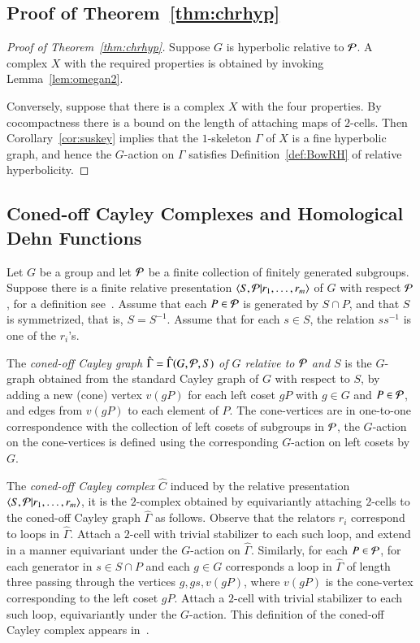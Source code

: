  \subsection{Proof of Theorem~\ref{thm:chrhyp}}



 \begin{proof}[Proof of Theorem~\ref{thm:chrhyp}]
Suppose $G$ is hyperbolic relative to $\mathcal P$.  A complex $X$ with the required properties is obtained by invoking Lemma~\ref{lem:omegan2}.

Conversely,  suppose that there is a complex $X$ with the four properties. By cocompactness there is a bound on the length of attaching maps of $2$-cells. Then Corollary~\ref{cor:suskey} implies that the $1$-skeleton $\Gamma$ of $X$ is a fine hyperbolic graph, and hence  the $G$-action on $\Gamma$ satisfies Definition~\ref{def:BowRH} of relative hyperbolicity.
\end{proof}


\subsection{Coned-off Cayley Complexes and Homological Dehn Functions}\label{sec:3.3}

 
Let $G$ be a group and let $\mathcal P$ be a finite collection of finitely generated subgroups.
Suppose there is a finite relative presentation   $\langle S, \mathcal P |  r_1, \ldots, r_m \rangle$ of $G$   with respect $\mathcal P$, for a definition see~\cite{Os06}.  Assume  that each $P\in \mathcal P$ is generated by $S\cap P$, and that $S$ is symmetrized, that is, $S=S^{-1}$. Assume that for each $s\in S$, the relation $ss^{-1}$ is one of the $r_i$'s.  

The \emph{coned-off Cayley graph $\hat \Gamma = \hat \Gamma (G, \mathcal P, S)$  of $G$ relative to $\mathcal P$ and $S$} is the $G$-graph obtained from the standard Cayley graph of $G$ with respect to $S$,  by adding  a new (cone) vertex $v(gP)$ for each left coset $gP$ with $g\in G$ and $P\in \mathcal P$, and edges from $v(gP)$ to each element of $P$. The cone-vertices are in one-to-one correspondence with the collection of left cosets of subgroups in $\mathcal P$, the $G$-action on the cone-vertices is defined using the corresponding $G$-action on left cosets by $G$.   



 The \emph{coned-off Cayley complex $\hat C$} induced by the relative presentation  $\langle S, \mathcal P |  r_1, \ldots, r_m \rangle$,  it is the $2$-complex obtained by equivariantly attaching $2$-cells to the coned-off Cayley graph $\hat \Gamma$  as follows.  Observe that the relators $r_i$ correspond to loops in $\hat \Gamma$. Attach a $2$-cell with trivial stabilizer to each such loop, and extend in a manner equivariant under the $G$-action on $\hat \Gamma$. Similarly, for each $P\in \mathcal P$, for each generator in $s\in S\cap P$ and each $g\in G$ corresponds a loop in $\hat \Gamma$ of length three passing through the vertices $g, gs, v(gP)$, where $v(gP)$ is the cone-vertex corresponding to the left coset $gP$. Attach a $2$-cell with trivial stabilizer to each such loop, equivariantly under the $G$-action. This definition of the coned-off Cayley complex appears in~\cite[Definition 2.47]{GrMa09}.
 
